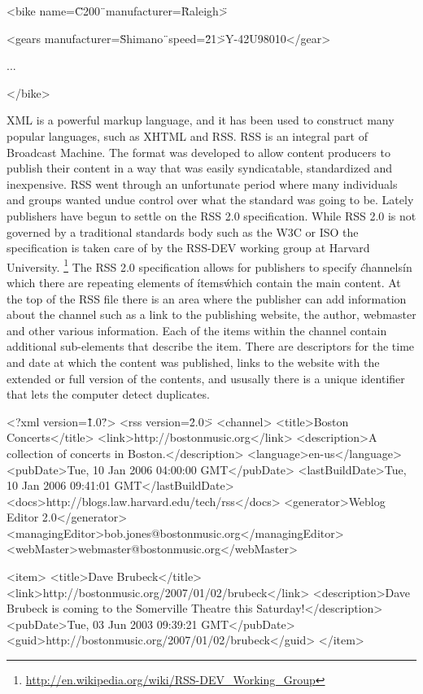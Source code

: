 \documentclass[a4paper,12pt]{report}
\begin{document}
<bike name=\"C200\"\ manufacturer=\"Raleigh\">

<gears manufacturer=\"Shimano\"\ speed=\"21\">Y-42U98010</gear>

...

</bike>


XML is a powerful markup language, and it has been used to construct many popular languages, such as XHTML and RSS.
RSS is an integral part of Broadcast Machine.
The format was developed to allow content producers to publish their content in a way that was easily syndicatable, standardized and inexpensive.
RSS went through an unfortunate period where many individuals and groups wanted undue control over what the standard was going to be.
Lately publishers have begun to settle on the RSS 2.0 specification.
While RSS 2.0 is not governed by a traditional standards body such as 
the W3C or ISO the specification is taken care of by the RSS-DEV working 
group at Harvard University. \footnote{\url{http://en.wikipedia.org/wiki/RSS-DEV\_Working\_Group}}
The RSS 2.0 specification allows for publishers to specify \'channels\' in which there are repeating elements of \'items\' which contain the main content.
At the top of the RSS file there is an area where the publisher can add information about the channel such as a link to the publishing website, the author, webmaster and other various information.
Each of the items within the channel contain additional sub-elements that describe the item.
There are descriptors for the time and date at which the content was published, links to the website with the extended or full version of the contents, and ususally there is a unique identifier that lets the computer detect duplicates. 

<?xml version=\"1.0\"?>
<rss version=\"2.0\">
  <channel>
    <title>Boston Concerts</title>
    <link>http://bostonmusic.org</link>
    <description>A collection of concerts in Boston.</description>
    <language>en-us</language>
    <pubDate>Tue, 10 Jan 2006 04:00:00 GMT</pubDate>
    <lastBuildDate>Tue, 10 Jan 2006 09:41:01 GMT</lastBuildDate>
    <docs>http://blogs.law.harvard.edu/tech/rss</docs>
    <generator>Weblog Editor 2.0</generator>
    <managingEditor>bob.jones@bostonmusic.org</managingEditor>
    <webMaster>webmaster@bostonmusic.org</webMaster>

    <item>
      <title>Dave Brubeck</title>
      <link>http://bostonmusic.org/2007/01/02/brubeck</link>
      <description>Dave Brubeck is coming to the Somerville Theatre this Saturday!</description>
      <pubDate>Tue, 03 Jun 2003 09:39:21 GMT</pubDate>
      <guid>http://bostonmusic.org/2007/01/02/brubeck</guid>
    </item>
\end{document}
